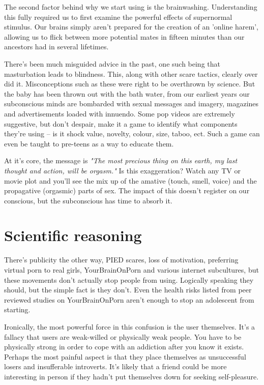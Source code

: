 \documentclass[easypeasy.tex]{subfiles}
\begin{document}
The second factor behind why we start using is the brainwashing. Understanding this fully required us to first examine the powerful effects of supernormal stimulus. Our brains simply aren't prepared for the creation of an 'online harem', allowing us to flick between more potential mates in fifteen minutes than our ancestors had in several lifetimes.

There's been much misguided advice in the past, one such being that masturbation leads to blindness. This, along with other scare tactics, clearly over did it. Misconceptions such as these were right to be overthrown by science. But the baby has been thrown out with the bath water, from our earliest years our subconscious minds are bombarded with sexual messages and imagery, magazines and advertisements loaded with innuendo. Some pop videos are extremely suggestive, but don't despair, make it a game to identify what components they're using -- is it shock value, novelty, colour, size, taboo, ect. Such a game can even be taught to pre-teens as a way to educate them.

At it's core, the message is \textit{"The most precious thing on this earth, my last thought and action, will be orgasm."} Is this exaggeration? Watch any TV or movie plot and you'll see the mix up of the amative (touch, smell, voice) and the propagative (orgasmic) parts of sex. The impact of this doesn't register on our conscious, but the subconscious has time to absorb it.

\section{Scientific reasoning}
There's publicity the other way, PIED scares, loss of motivation, preferring virtual porn to real girls, YourBrainOnPorn and various internet subcultures, but these movements don't actually stop people from using. Logically speaking they should, but the simple fact is they don't. Even the health risks listed from peer reviewed studies on YourBrainOnPorn aren't enough to stop an adolescent from starting.

Ironically, the most powerful force in this confusion is the user themselves. It's a fallacy that users are weak-willed or physically weak people. You have to be physically strong in order to cope with an addiction after you know it exists. Perhaps the most painful aspect is that they place themselves as unsuccessful losers and insufferable introverts. It's likely that a friend could be more interesting in person if they hadn't put themselves down for seeking self-pleasure.
\end{document}
